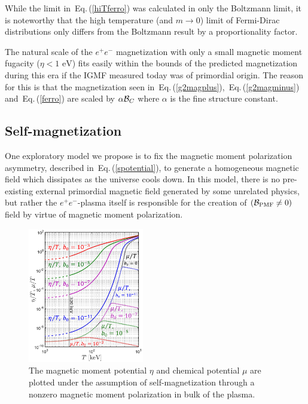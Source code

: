 \documentclass[aps,prd,floatfix,reprint]{revtex4-2}
\newcommand*{\eV}{\text{ eV}}
\newcommand{\req}[1]{Eq.\,(\ref{#1})}
\begin{document}
While the limit in~\req{hiTferro} was calculated in only the Boltzmann limit, it is noteworthy that the high temperature (and $m\rightarrow0$) limit of Fermi-Dirac distributions only differs from the Boltzmann result by a proportionality factor. 

The natural scale of the $e^{+}e^{-}$ magnetization with only a small magnetic moment fugacity ($\eta<1\eV$) fits easily within the bounds of the predicted magnetization during this era if the IGMF measured today was of primordial origin. The reason for this is that the magnetization seen in~\req{g2magplus},~\req{g2magminus} and~\req{ferro} are scaled by $\alpha{\cal B}_{C}$ where $\alpha$ is the fine structure constant.

\subsection{Self-magnetization}
\label{sec:self}

\noindent One exploratory model we propose is to fix the magnetic moment polarization asymmetry, described in~\req{spotential}, to generate a homogeneous magnetic field which dissipates as the universe cools down. In this model, there is no pre-existing external primordial magnetic field generated by some unrelated physics, but rather the $e^{+}e^{-}$-plasma itself is responsible for the creation of $({\cal B}_{\rm PMF}\ne 0)$ field by virtue of magnetic moment polarization. 
\begin{figure}[ht]
 \centering
 \includegraphics[width=0.45\textwidth]{plots/Spinchemical_03.png}
 \caption{The magnetic moment potential $\eta$ and chemical potential $\mu$ are plotted under the assumption of self-magnetization through a nonzero magnetic moment polarization in bulk of the plasma.}
 \label{fig:self} 
\end{figure}
\end{document}

